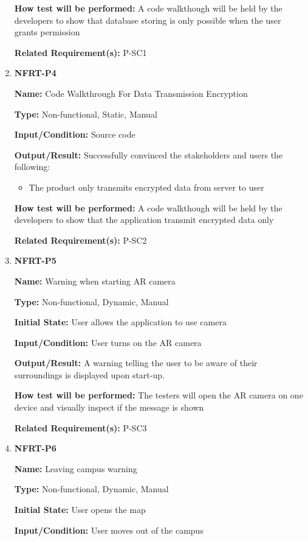 \documentclass[12pt, titlepage]{article}
\begin{document}
\begin{enumerate}
\textbf{How test will be performed:} A code walkthough will be held by the developers to show that database storing is only possible when the user grants permission

\textbf{Related Requirement(s):} P-SC1

\item{\textbf{NFRT-P4}}

\textbf{Name:} Code Walkthrough For Data Transmission Encryption

\textbf{Type:} Non-functional, Static, Manual

\textbf{Input/Condition:} Source code

\textbf{Output/Result:} Successfully convinced the stakeholders and users the following:
\begin{itemize}
  \item The product only transmits encrypted data from server to user
\end{itemize}

\textbf{How test will be performed:}  A code walkthough will be held by the developers to show that the application transmit encrypted data only

\textbf{Related Requirement(s):} P-SC2

\item{\textbf{NFRT-P5}}

\textbf{Name:} Warning when starting AR camera

\textbf{Type:} Non-functional, Dynamic, Manual
					
\textbf{Initial State:} User allows the application to use camera
					
\textbf{Input/Condition:} User turns on the AR camera
					
\textbf{Output/Result:} A warning telling the user to be aware of their surroundings is displayed upon start-up.

\textbf{How test will be performed:} The testers will open the AR camera on one device and visually inspect if the message is shown

\textbf{Related Requirement(s):} P-SC3

\item{\textbf{NFRT-P6}}

\textbf{Name:} Leaving campus warning

\textbf{Type:} Non-functional, Dynamic, Manual
					
\textbf{Initial State:} User opens the map
					
\textbf{Input/Condition:} User moves out of the campus
					

\end{enumerate}
\end{document}
